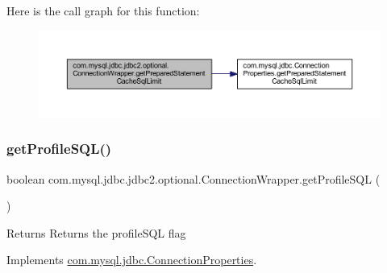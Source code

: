 Here is the call graph for this function\+:
\nopagebreak
\begin{figure}[H]
\begin{center}
\leavevmode
\includegraphics[width=350pt]{classcom_1_1mysql_1_1jdbc_1_1jdbc2_1_1optional_1_1_connection_wrapper_ac12acf3f17ba3cff3c14bce4eff86c66_cgraph}
\end{center}
\end{figure}
\mbox{\label{classcom_1_1mysql_1_1jdbc_1_1jdbc2_1_1optional_1_1_connection_wrapper_a2e1b1b2b6690b7b02510266fc541f86f}} 
\subsubsection{\texorpdfstring{get\+Profile\+S\+Q\+L()}{getProfileSQL()}}
{\footnotesize\ttfamily boolean com.\+mysql.\+jdbc.\+jdbc2.\+optional.\+Connection\+Wrapper.\+get\+Profile\+S\+QL (\begin{DoxyParamCaption}{ }\end{DoxyParamCaption})}

\begin{DoxyReturn}{Returns}
Returns the profile\+S\+QL flag 
\end{DoxyReturn}


Implements \mbox{\hyperlink{interfacecom_1_1mysql_1_1jdbc_1_1_connection_properties_af0e1c9e18770d1c2478851ab1dcd1d70}{com.\+mysql.\+jdbc.\+Connection\+Properties}}.

